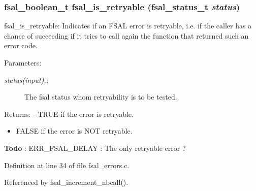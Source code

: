 \subsubsection[{fsal\_\-is\_\-retryable}]{\setlength{\rightskip}{0pt plus 5cm}fsal\_\-boolean\_\-t fsal\_\-is\_\-retryable (fsal\_\-status\_\-t {\em status})}\label{fsal__errors_8c_dd52bcb75d7fb46f9c0355f264a6689f}


fsal\_\-is\_\-retryable: Indicates if an FSAL error is retryable, i.e. if the caller has a chance of succeeding if it tries to call again the function that returned such an error code.

\begin{Desc}
\item[Parameters:]
\begin{description}
\item[{\em status(input),:}]The fsal status whom retryability is to be tested.\end{description}
\end{Desc}
\begin{Desc}
\item[Returns:]- TRUE if the error is retryable.\begin{itemize}
\item FALSE if the error is NOT retryable. \end{itemize}
\end{Desc}


\begin{Desc}
\item[{\bf Todo}]: ERR\_\-FSAL\_\-DELAY : The only retryable error ? \end{Desc}


Definition at line 34 of file fsal\_\-errors.c.

Referenced by fsal\_\-increment\_\-nbcall().